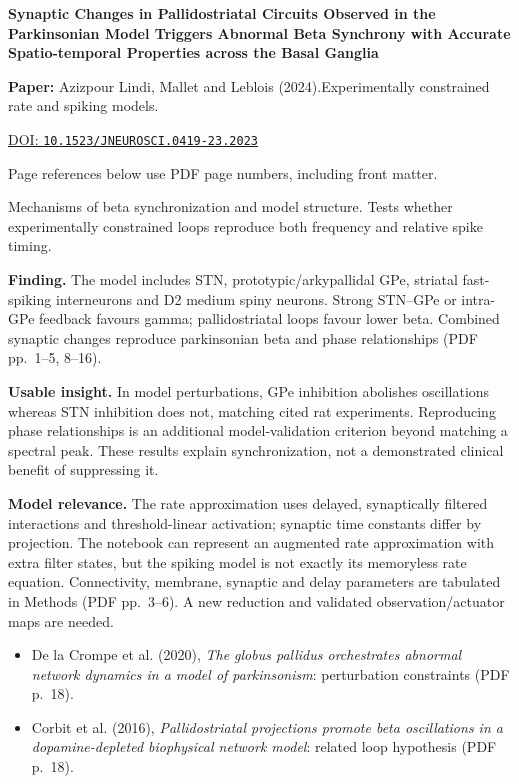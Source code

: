 

{\Large\bfseries Synaptic Changes in Pallidostriatal Circuits Observed in the Parkinsonian Model Triggers Abnormal Beta Synchrony with Accurate Spatio-temporal Properties across the Basal Ganglia\par}

\textbf{Paper:} Azizpour Lindi, Mallet and Leblois (2024).\quad Experimentally constrained rate and spiking models.\par
\href{https://doi.org/10.1523/JNEUROSCI.0419-23.2023}{DOI: \nolinkurl{10.1523/JNEUROSCI.0419-23.2023}}\par
{\footnotesize Page references below use PDF page numbers, including front matter.}

Mechanisms of beta synchronization and model structure. Tests whether experimentally constrained loops reproduce both frequency and relative spike timing.

\textbf{Finding.} The model includes STN, prototypic/arkypallidal GPe, striatal fast-spiking interneurons and D2 medium spiny neurons. Strong STN--GPe or intra-GPe feedback favours gamma; pallidostriatal loops favour lower beta. Combined synaptic changes reproduce parkinsonian beta and phase relationships (PDF pp.~1--5, 8--16).

\textbf{Usable insight.} In model perturbations, GPe inhibition abolishes oscillations whereas STN inhibition does not, matching cited rat experiments. Reproducing phase relationships is an additional model-validation criterion beyond matching a spectral peak. These results explain synchronization, not a demonstrated clinical benefit of suppressing it.

\textbf{Model relevance.} The rate approximation uses delayed, synaptically filtered interactions and threshold-linear activation; synaptic time constants differ by projection. The notebook can represent an augmented rate approximation with extra filter states, but the spiking model is not exactly its memoryless rate equation. Connectivity, membrane, synaptic and delay parameters are tabulated in Methods (PDF pp.~3--6). A new reduction and validated observation/actuator maps are needed.

\begin{itemize}
\item De la Crompe et al. (2020), \emph{The globus pallidus orchestrates abnormal network dynamics in a model of parkinsonism}: perturbation constraints (PDF p.~18).
\item Corbit et al. (2016), \emph{Pallidostriatal projections promote beta oscillations in a dopamine-depleted biophysical network model}: related loop hypothesis (PDF p.~18).
\end{itemize}


